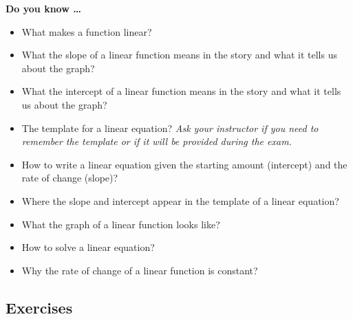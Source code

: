 
 
 
\noindent \textbf{Do you know \ldots}

\begin{itemize} 
\item What makes a function linear? 
\item What the slope of a linear function means in the story and what it tells us about the graph? 
\item What the intercept of a linear function means in the story and what it tells us about the graph? 
\item The template for a linear equation?  \emph{Ask your instructor if you need to remember the template or if it will be provided during the exam.}
\item How to write a linear equation given the starting amount (intercept) and the rate of change (slope)?   
\item Where the slope and intercept appear in the template of a linear equation? 
\item What the graph of a linear function looks like? 
\item How to solve a linear equation?  
\item Why the rate of change of a linear function is constant?  
 
\end{itemize}

\subsection*{Exercises}

